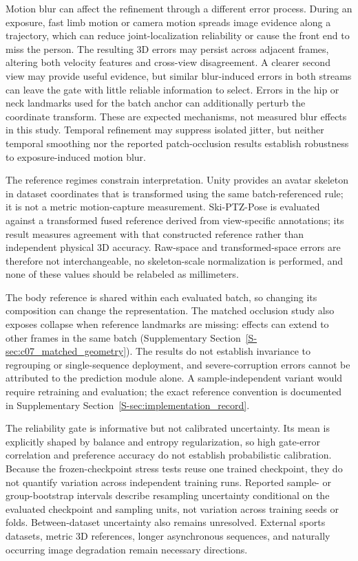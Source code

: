 \documentclass[preprint,12pt]{elsarticle}
\begin{document}
Motion blur can affect the refinement through a different error process. During an exposure, fast limb motion or camera motion spreads image evidence along a trajectory, which can reduce joint-localization reliability or cause the front end to miss the person. The resulting 3D errors may persist across adjacent frames, altering both velocity features and cross-view disagreement. A clearer second view may provide useful evidence, but similar blur-induced errors in both streams can leave the gate with little reliable information to select. Errors in the hip or neck landmarks used for the batch anchor can additionally perturb the coordinate transform. These are expected mechanisms, not measured blur effects in this study. Temporal refinement may suppress isolated jitter, but neither temporal smoothing nor the reported patch-occlusion results establish robustness to exposure-induced motion blur.

The reference regimes constrain interpretation. Unity provides an avatar skeleton in dataset coordinates that is transformed using the same batch-referenced rule; it is not a metric motion-capture measurement. Ski-PTZ-Pose is evaluated against a transformed fused reference derived from view-specific annotations; its result measures agreement with that constructed reference rather than independent physical 3D accuracy. Raw-space and transformed-space errors are therefore not interchangeable, no skeleton-scale normalization is performed, and none of these values should be relabeled as millimeters.

The body reference is shared within each evaluated batch, so changing its composition can change the representation. The matched occlusion study also exposes collapse when reference landmarks are missing: effects can extend to other frames in the same batch (Supplementary Section~\ref{S-sec:c07_matched_geometry}). The results do not establish invariance to regrouping or single-sequence deployment, and severe-corruption errors cannot be attributed to the prediction module alone. A sample-independent variant would require retraining and evaluation; the exact reference convention is documented in Supplementary Section~\ref{S-sec:implementation_record}.

The reliability gate is informative but not calibrated uncertainty. Its mean is explicitly shaped by balance and entropy regularization, so high gate-error correlation and preference accuracy do not establish probabilistic calibration. Because the frozen-checkpoint stress tests reuse one trained checkpoint, they do not quantify variation across independent training runs. Reported sample- or group-bootstrap intervals describe resampling uncertainty conditional on the evaluated checkpoint and sampling units, not variation across training seeds or folds. Between-dataset uncertainty also remains unresolved. External sports datasets, metric 3D references, longer asynchronous sequences, and naturally occurring image degradation remain necessary directions.
\end{document}
